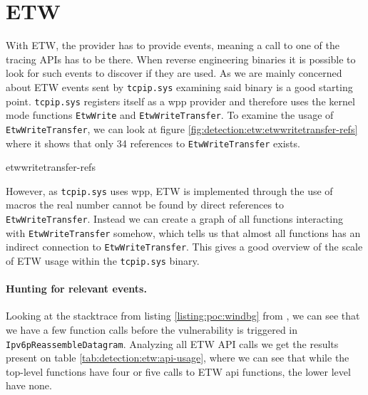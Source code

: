 \documentclass{report}
\begin{document}
\section{\acrfull{ETW}}
\label{sec:detection:etw}
With \gls{ETW}, the provider has to provide events, meaning a call to one of the tracing APIs has to be there. When reverse engineering binaries it is possible to look for such events to discover if they are used. As we are mainly concerned about \gls{ETW} events sent by \texttt{tcpip.sys} examining said binary is a good starting point. \texttt{tcpip.sys} registers itself as a \gls{wpp} provider and therefore uses the kernel mode functions \texttt{EtwWrite} and \texttt{EtwWriteTransfer}\cite{url:etw:kernel-mode-functions}. To examine the usage of \texttt{EtwWriteTransfer}, we can look at figure \ref{fig:detection:etw:etwwritetransfer-refs} where it shows that only 34 references to \texttt{EtwWriteTransfer} exists.

{etwwritetransfer-refs}

However, as \texttt{tcpip.sys} uses \gls{wpp}, \gls{ETW} is implemented through the use of macros\cite{url:etw:wpp:kernel-drivers} the real number cannot be found by direct references to \texttt{EtwWriteTransfer}. Instead we can create a graph of all functions interacting with \texttt{EtwWriteTransfer} somehow, which tells us that almost all functions has an indirect connection to \texttt{EtwWriteTransfer}. This gives a good overview of the scale of \gls{ETW} usage within the \texttt{tcpip.sys} binary.

\paragraph{Hunting for relevant events.} Looking at the stacktrace from listing \ref{listing:poc:windbg} from , we can see that we have a few function calls before the vulnerability is triggered in \texttt{Ipv6pReassembleDatagram}. Analyzing all \gls{ETW} API calls we get the results present on table \ref{tab:detection:etw:api-usage}, where we can see that while the top-level functions have four or five calls to \gls{ETW} api functions, the lower level have none.
\end{document}
